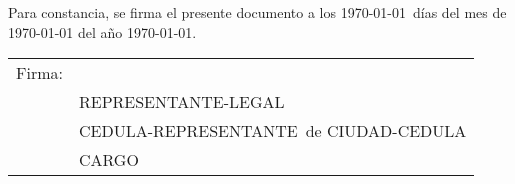 \documentclass[11pt,a4paper]{letter} %
\def\Who{REPRESENTANTE-LEGAL} %
\def\What{CARGO} %
\def\CC{CEDULA-REPRESENTANTE}
\def\ciudadCC{CIUDAD-CEDULA}
\begin{document}
\begin{letter}
\noindent Para constancia, se firma el presente documento a los \usrday\today \ días del mes de \hspace{-3.6em} \usrmonth\today \hspace{-1em} del año \usryear\today.

\closing{ }

\begin{tabular}{@{}p{0.7in}p{4in}@{}}
Firma: & \hrulefill \\
& \Who \\
& \CC\ de \ciudadCC \\
& \What \\
\end{tabular}


\end{letter}
\end{document}
